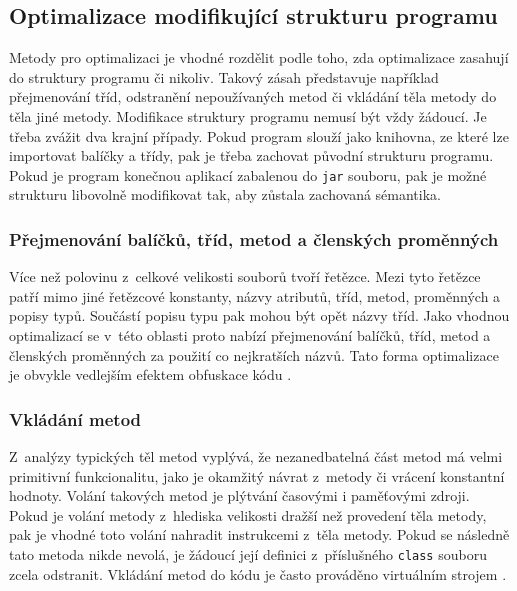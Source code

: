 \subsection{Optimalizace modifikující strukturu programu}

Metody pro optimalizaci je vhodné rozdělit podle toho, zda optimalizace zasahují do struktury programu či nikoliv. Takový zásah představuje například přejmenování tříd, odstranění nepoužívaných metod či vkládání těla metody do těla jiné metody.
Modifikace struktury programu nemusí být vždy žádoucí. Je třeba zvážit dva krajní případy. Pokud program slouží jako knihovna, ze které lze importovat balíčky a třídy, pak je třeba zachovat původní strukturu programu. Pokud je program konečnou aplikací zabalenou do \texttt{jar} souboru, pak je možné strukturu libovolně modifikovat tak, aby zůstala zachovaná sémantika.

\subsubsection{Přejmenování balíčků, tříd, metod a členských proměnných}
Více než polovinu z~celkové velikosti souborů tvoří řetězce. Mezi tyto řetězce patří mimo jiné řetězcové konstanty, názvy atributů, tříd, metod, proměnných a popisy typů. Součástí popisu typu pak mohou být opět názvy tříd. Jako vhodnou optimalizací se v~této oblasti proto nabízí přejmenování balíčků, tříd, metod a členských proměnných za použití co nejkratších názvů. Tato forma optimalizace je obvykle vedlejším efektem obfuskace kódu \cite{Chan:Obfuscation}.

\subsubsection{Vkládání metod}
Z~analýzy typických těl metod vyplývá, že nezanedbatelná část metod má velmi primitivní funkcionalitu, jako je okamžitý návrat z~metody či vrácení konstantní hodnoty. Volání takových metod je plýtvání časovými i paměťovými zdroji. Pokud je volání metody z~hlediska velikosti dražší než provedení těla metody, pak je vhodné toto volání nahradit instrukcemi z~těla metody. Pokud se následně tato metoda nikde nevolá, je žádoucí její definici z~příslušného \texttt{class} souboru zcela odstranit. Vkládání metod do kódu je často prováděno virtuálním strojem \cite{Oracle:JVM}.


